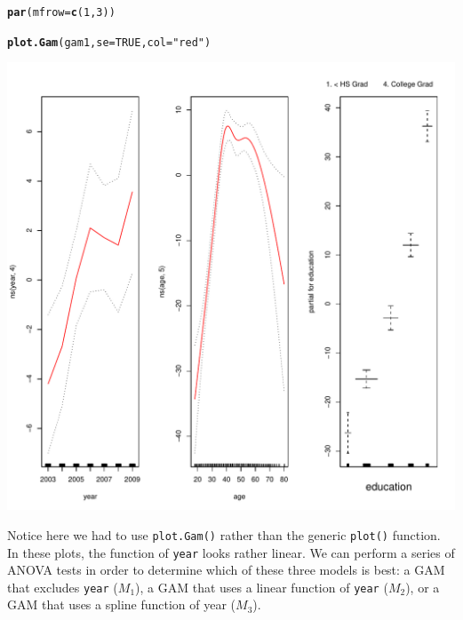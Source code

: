 \documentclass[12pt]{article}\usepackage[]{graphicx}\usepackage[]{color}
\makeatletter
\def\maxwidth{ %
  \ifdim\Gin@nat@width>\linewidth
    \linewidth
  \else
    \Gin@nat@width
  \fi
}
\newcommand{\hlnum}[1]{\textcolor[rgb]{0.686,0.059,0.569}{#1}}%
\newcommand{\hlstr}[1]{\textcolor[rgb]{0.192,0.494,0.8}{#1}}%
\newcommand{\hlstd}[1]{\textcolor[rgb]{0.345,0.345,0.345}{#1}}%
\newcommand{\hlkwc}[1]{\textcolor[rgb]{0.333,0.667,0.333}{#1}}%
\newcommand{\hlkwd}[1]{\textcolor[rgb]{0.737,0.353,0.396}{\textbf{#1}}}%
\newenvironment{kframe}{%
 \def\at@end@of@kframe{}%
 \ifinner\ifhmode%
  \def\at@end@of@kframe{\end{minipage}}%
  \begin{minipage}{\columnwidth}%
 \fi\fi%
 \def\FrameCommand##1{\hskip\@totalleftmargin \hskip-\fboxsep
 \colorbox{shadecolor}{##1}\hskip-\fboxsep
     \hskip-\linewidth \hskip-\@totalleftmargin \hskip\columnwidth}%
 \MakeFramed {\advance\hsize-\width
   \@totalleftmargin\z@ \linewidth\hsize
   \@setminipage}}%
 {\par\unskip\endMakeFramed%
 \at@end@of@kframe}
\newenvironment{knitrout}{}{} %
\makeatother
\begin{document}
\begin{knitrout}
\color{fgcolor}\begin{kframe}
\begin{alltt}
\hlkwd{par}\hlstd{(}\hlkwc{mfrow}\hlstd{=}\hlkwd{c}\hlstd{(}\hlnum{1}\hlstd{,}\hlnum{3}\hlstd{))}

\hlkwd{plot.Gam}\hlstd{(gam1,} \hlkwc{se}\hlstd{=}\hlnum{TRUE}\hlstd{,} \hlkwc{col}\hlstd{=}\hlstr{"red"}\hlstd{)}
\end{alltt}
\end{kframe}
\includegraphics[width=\maxwidth]{figure/unnamed-chunk-26-1} 

\end{knitrout}

Notice here we had to use \texttt{plot.Gam()} rather than the generic \texttt{plot()} function.\\

In these plots, the function of \texttt{year} looks rather linear. We can perform a series of ANOVA tests in order to determine which of these three models is best: a GAM that excludes \texttt{year} ($M_1$), a GAM that uses a linear function of \texttt{year} ($M_2$), or a GAM that uses a spline function of year ($M_3$).
\end{document}
